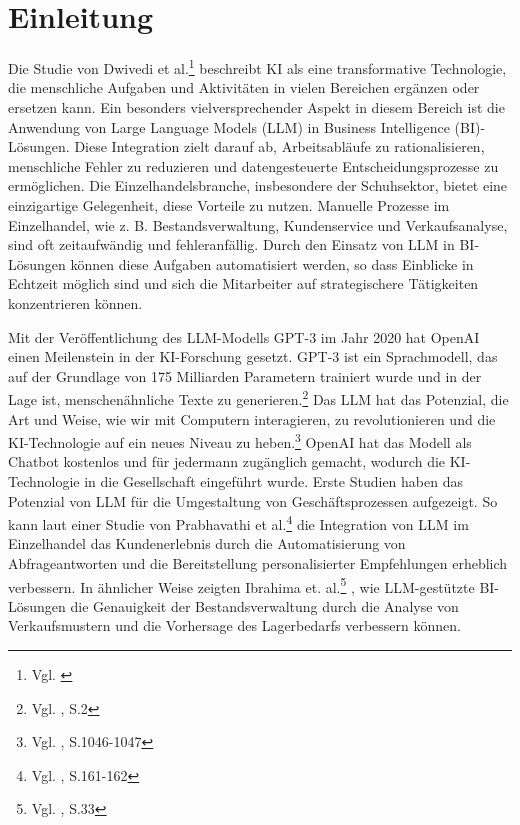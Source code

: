 

\section{Einleitung} 
\label{sec:einleitung}

Die Studie von Dwivedi et al.\footnote{Vgl. \cite{DwivediHughes2021}} beschreibt KI als eine transformative Technologie, die menschliche Aufgaben und Aktivitäten in vielen Bereichen ergänzen oder ersetzen kann. Ein besonders vielversprechender Aspekt in diesem Bereich ist die Anwendung von Large Language Models (LLM) in Business Intelligence (BI)-Lösungen. Diese Integration zielt darauf ab, Arbeitsabläufe zu rationalisieren, menschliche Fehler zu reduzieren und datengesteuerte Entscheidungsprozesse zu ermöglichen. 
Die Einzelhandelsbranche, insbesondere der Schuhsektor, bietet eine einzigartige Gelegenheit, diese Vorteile zu nutzen. Manuelle Prozesse im Einzelhandel, wie z. B. Bestandsverwaltung, Kundenservice und Verkaufsanalyse, sind oft zeitaufwändig und fehleranfällig. Durch den Einsatz von LLM in BI-Lösungen können diese Aufgaben automatisiert werden, so dass Einblicke in Echtzeit möglich sind und sich die Mitarbeiter auf strategischere Tätigkeiten konzentrieren können.


Mit der Veröffentlichung des LLM-Modells GPT-3 im Jahr 2020 hat OpenAI einen Meilenstein in der KI-Forschung gesetzt. GPT-3 ist ein Sprachmodell, das auf der Grundlage von 175 Milliarden Parametern trainiert wurde und in der Lage ist, menschenähnliche Texte zu generieren.\footnote{Vgl. \cite{Brown2020}, S.2} Das LLM hat das Potenzial, die Art und Weise, wie wir mit Computern interagieren, zu revolutionieren und die KI-Technologie auf ein neues Niveau zu heben.\footnote{Vgl. \cite{Lu2021}, S.1046-1047} OpenAI hat das Modell als Chatbot kostenlos und für jedermann zugänglich gemacht, wodurch die KI-Technologie in die Gesellschaft eingeführt wurde. Erste Studien haben das Potenzial von LLM für die Umgestaltung von Geschäftsprozessen aufgezeigt. So kann laut einer Studie von Prabhavathi et al.\footnote{Vgl. \cite{Prabhavathi2019}, S.161-162} die Integration von LLM im Einzelhandel das Kundenerlebnis durch die Automatisierung von Abfrageantworten und die Bereitstellung personalisierter Empfehlungen erheblich verbessern. In ähnlicher Weise zeigten Ibrahima et. al.\footnote{Vgl. \cite{Ibrahima2021}, S.33} , wie LLM-gestützte BI-Lösungen die Genauigkeit der Bestandsverwaltung durch die Analyse von Verkaufsmustern und die Vorhersage des Lagerbedarfs verbessern können.


